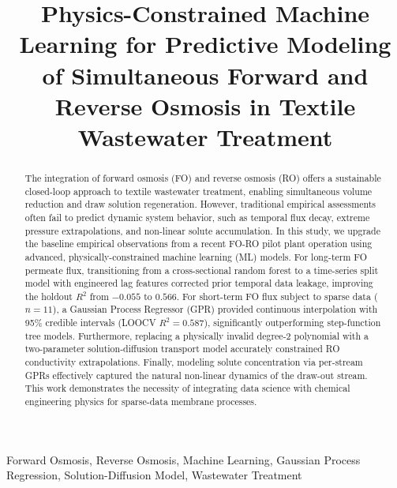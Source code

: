 \documentclass[journal, onecolumn, 12pt]{IEEEtran}
\begin{document}
\title{Physics-Constrained Machine Learning for Predictive Modeling of Simultaneous Forward and Reverse Osmosis in Textile Wastewater Treatment}

\author{
}

\maketitle

\begin{abstract}
The integration of forward osmosis (FO) and reverse osmosis (RO) offers a sustainable closed-loop approach to textile wastewater treatment, enabling simultaneous volume reduction and draw solution regeneration. However, traditional empirical assessments often fail to predict dynamic system behavior, such as temporal flux decay, extreme pressure extrapolations, and non-linear solute accumulation. In this study, we upgrade the baseline empirical observations from a recent FO-RO pilot plant operation using advanced, physically-constrained machine learning (ML) models. For long-term FO permeate flux, transitioning from a cross-sectional random forest to a time-series split model with engineered lag features corrected prior temporal data leakage, improving the holdout $R^2$ from $-0.055$ to $0.566$. For short-term FO flux subject to sparse data ($n=11$), a Gaussian Process Regressor (GPR) provided continuous interpolation with 95\% credible intervals (LOOCV $R^2 = 0.587$), significantly outperforming step-function tree models. Furthermore, replacing a physically invalid degree-2 polynomial with a two-parameter solution-diffusion transport model accurately constrained RO conductivity extrapolations. Finally, modeling solute concentration via per-stream GPRs effectively captured the natural non-linear dynamics of the draw-out stream. This work demonstrates the necessity of integrating data science with chemical engineering physics for sparse-data membrane processes.
\end{abstract}

\begin{IEEEkeywords}
Forward Osmosis, Reverse Osmosis, Machine Learning, Gaussian Process Regression, Solution-Diffusion Model, Wastewater Treatment
\end{IEEEkeywords}
\end{document}
